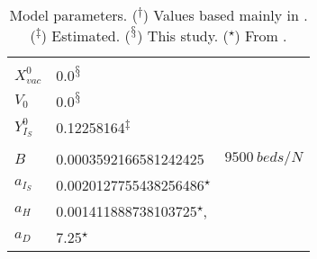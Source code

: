 \begin{table*}
\begin{tabular}{@{}llr@{}}
            &
        \\
            $X_{vac}^0$
            & 0.0\textsuperscript{$\mathsection$}
            &
        \\
            $V_0$
            & 0.0\textsuperscript{$\mathsection$}
            &
        \\
            $Y_{I_S} ^ 0$ &
            \num{0.12258164}\textsuperscript{$\ddagger$}
            &
        \\
        \\
            $B$
        &
            \num{0.0003592166581242425}
        &
            $
                \displaystyle
                \SI{9500}{beds} / {N}
            $
        \\
          $a_{I_S}$
            & \num{0.0020127755438256486}\textsuperscript{$\star$}
            &
        \\
          $a_{H}$
            & \num{0.001411888738103725}\textsuperscript{$\star$},
            &
        \\
            $a_D$
            & \num{7.25}\textsuperscript{$\star$}
            &
        \\
        \bottomrule
    \end{tabular}
    \caption{
        Model parameters. (\textsuperscript{$\dagger$}) Values based 
        mainly in \cite{Zhao2020, Ferguson2020}. 
        (\textsuperscript{$\ddagger$}) Estimated.
        (\textsuperscript{$\mathsection$}) 
        This study. (\textsuperscript{$\star$})
        From \cite{Jo2020}.
    } \label{tbl:parameters_values}
\end{table*}